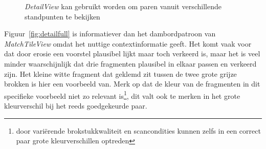 \begin{figure}[!hbt]
  \centering
  \caption{\emph{DetailView} kan gebruikt worden om paren vanuit verschillende standpunten te bekijken}
  \label{fig:detail1}
\end{figure}

Figuur~\ref{fig:detailfull} is informatiever dan het dambordpatroon van \emph{MatchTileView} omdat het nuttige contextinformatie geeft. Het komt vaak voor dat door erosie een voorstel plausibel lijkt maar toch verkeerd is, maar het is veel minder waarschijnlijk dat drie fragmenten plausibel in elkaar passen en verkeerd zijn. Het kleine witte fragment dat geklemd zit tussen de twee grote grijze brokken is hier een voorbeeld van. Merk op dat de kleur van de fragmenten in dit specifieke voorbeeld niet zo relevant is\footnote{door vari\"erende brokstukkwaliteit en scancondities kunnen zelfs in een correct paar grote kleurverschillen optreden}, dit valt ook te merken in het grote kleurverschil bij het reeds goedgekeurde paar.\\

